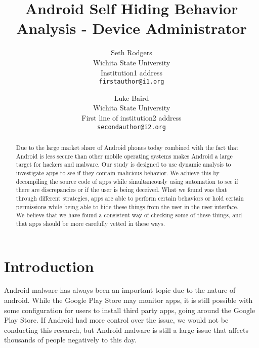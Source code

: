 \documentclass[10pt,twocolumn,letterpaper]{article}
\begin{document}
\title{Android Self Hiding Behavior Analysis - Device Administrator}

\author{Seth Rodgers\\
Wichita State University\\
Institution1 address\\
{\tt\small firstauthor@i1.org}
\and
Luke Baird\\
Wichita State University\\
First line of institution2 address\\
{\tt\small secondauthor@i2.org}
}

\maketitle


\begin{abstract}
Due to the large market share of Android phones today combined with the fact that Android is less secure than other mobile operating systems makes Android a large target for hackers and malware. Our study is designed to use dynamic analysis to investigate apps to see if they contain malicious behavior. We achieve this by decompiling the source code of apps while simultaneously using automation to see if there are discrepancies or if the user is being deceived. What we found was that through different strategies, apps are able to perform certain behaviors or hold certain permissions while being able to hide these things from the user in the user interface. We believe that we have found a consistent way of checking some of these things, and that apps should be more carefully vetted in these ways.
\end{abstract}

\section{Introduction}

Android malware has always been an important topic due to the nature of android. While the Google Play Store may monitor apps, it is still possible with some configuration for users to install third party apps, going around the Google Play Store. If Android had more control over the issue, we would not be conducting this research, but Android malware is still a large issue that affects thousands of people negatively to this day.
\end{document}
